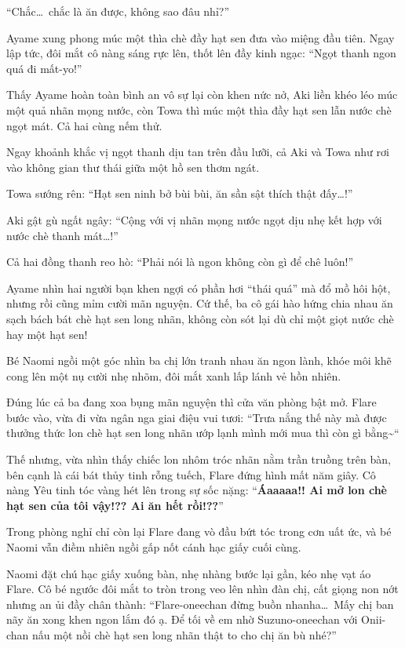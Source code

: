 \documentclass[../main.tex]{subfiles}
\begin{document}
``Chắc\dots\ chắc là ăn được, không sao đâu nhỉ?''

Ayame xung phong múc một thìa chè đầy hạt sen đưa vào miệng đầu tiên. Ngay lập tức, đôi mắt cô nàng sáng rực lên, thốt lên đầy kinh ngạc: ``Ngọt thanh ngon quá đi mất-yo!''

Thấy Ayame hoàn toàn bình an vô sự lại còn khen nức nở, Aki liền khéo léo múc một quả nhãn mọng nước, còn Towa thì múc một thìa đầy hạt sen lẫn nước chè ngọt mát. Cả hai cùng nếm thử.

Ngay khoảnh khắc vị ngọt thanh dịu tan trên đầu lưỡi, cả Aki và Towa như rơi vào không gian thư thái giữa một hồ sen thơm ngát.

Towa sướng rên: ``Hạt sen ninh bở bùi bùi, ăn sần sật thích thật đấy\dots!''

Aki gật gù ngất ngây: ``Cộng với vị nhãn mọng nước ngọt dịu nhẹ kết hợp với nước chè thanh mát\dots!''

Cả hai đồng thanh reo hò: ``Phải nói là ngon không còn gì để chê luôn!''

Ayame nhìn hai người bạn khen ngợi có phần hơi ``thái quá'' mà đổ mồ hôi hột, nhưng rồi cũng mỉm cười mãn nguyện. Cứ thế, ba cô gái hào hứng chia nhau ăn sạch bách bát chè hạt sen long nhãn, không còn sót lại dù chỉ một giọt nước chè hay một hạt sen!

Bé Naomi ngồi một góc nhìn ba chị lớn tranh nhau ăn ngon lành, khóe môi khẽ cong lên một nụ cười nhẹ nhõm, đôi mắt xanh lấp lánh vẻ hồn nhiên.

Đúng lúc cả ba đang xoa bụng mãn nguyện thì cửa văn phòng bật mở. Flare bước vào, vừa đi vừa ngân nga giai điệu vui tươi: ``Trưa nắng thế này mà được thưởng thức lon chè hạt sen long nhãn ướp lạnh mình mới mua thì còn gì bằng\~{}``

Thế nhưng, vừa nhìn thấy chiếc lon nhôm tróc nhãn nằm trần truồng trên bàn, bên cạnh là cái bát thủy tinh rỗng tuếch, Flare đứng hình mất năm giây. Cô nàng Yêu tinh tóc vàng hét lên trong sự sốc nặng: ``\textbf{Áaaaaa!! Ai mở lon chè hạt sen của tôi vậy!?? Ai ăn hết rồi!??}''

Trong phòng nghỉ chỉ còn lại Flare đang vò đầu bứt tóc trong cơn uất ức, và bé Naomi vẫn điềm nhiên ngồi gấp nốt cánh hạc giấy cuối cùng.

Naomi đặt chú hạc giấy xuống bàn, nhẹ nhàng bước lại gần, kéo nhẹ vạt áo Flare. Cô bé ngước đôi mắt to tròn trong veo lên nhìn đàn chị, cất giọng non nớt nhưng an ủi đầy chân thành: ``Flare-oneechan đừng buồn nhanha\dots\ Mấy chị ban nãy ăn xong khen ngon lắm đó ạ. Để tối về em nhờ Suzuno-oneechan với Onii-chan nấu một nồi chè hạt sen long nhãn thật to cho chị ăn bù nhé?''
\end{document}
